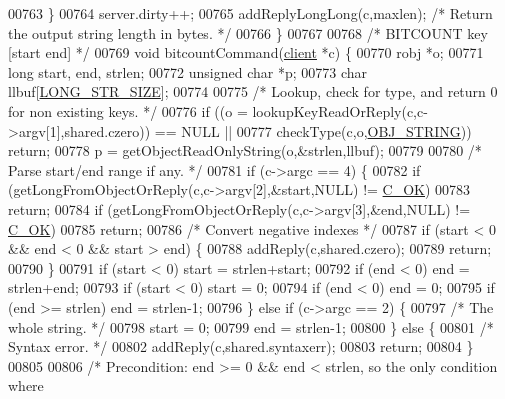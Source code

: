 \begin{DoxyCode}
{00763     \}
00764     server.dirty++;
00765     addReplyLongLong(c,maxlen); \textcolor{comment}{/* Return the output string length in bytes. */}
00766 \}
00767 
00768 \textcolor{comment}{/* BITCOUNT key [start end] */}
00769 \textcolor{keywordtype}{void} bitcountCommand(\hyperlink{structclient}{client} *c) \{
00770     robj *o;
00771     \textcolor{keywordtype}{long} start, end, strlen;
00772     \textcolor{keywordtype}{unsigned} \textcolor{keywordtype}{char} *p;
00773     \textcolor{keywordtype}{char} llbuf[\hyperlink{server_8h_a39ec35278876f65fc1ef70b049856ca3}{LONG\_STR\_SIZE}];
00774 
00775     \textcolor{comment}{/* Lookup, check for type, and return 0 for non existing keys. */}
00776     \textcolor{keywordflow}{if} ((o = lookupKeyReadOrReply(c,c->argv[1],shared.czero)) == NULL ||
00777         checkType(c,o,\hyperlink{server_8h_a65236ea160f69cdef33ec942092af88f}{OBJ\_STRING})) \textcolor{keywordflow}{return};
00778     p = getObjectReadOnlyString(o,&strlen,llbuf);
00779 
00780     \textcolor{comment}{/* Parse start/end range if any. */}
00781     \textcolor{keywordflow}{if} (c->argc == 4) \{
00782         \textcolor{keywordflow}{if} (getLongFromObjectOrReply(c,c->argv[2],&start,NULL) != \hyperlink{server_8h_a303769ef1065076e68731584e758d3e1}{C\_OK})
00783             \textcolor{keywordflow}{return};
00784         \textcolor{keywordflow}{if} (getLongFromObjectOrReply(c,c->argv[3],&end,NULL) != \hyperlink{server_8h_a303769ef1065076e68731584e758d3e1}{C\_OK})
00785             \textcolor{keywordflow}{return};
00786         \textcolor{comment}{/* Convert negative indexes */}
00787         \textcolor{keywordflow}{if} (start < 0 && end < 0 && start > end) \{
00788             addReply(c,shared.czero);
00789             \textcolor{keywordflow}{return};
00790         \}
00791         \textcolor{keywordflow}{if} (start < 0) start = strlen+start;
00792         \textcolor{keywordflow}{if} (end < 0) end = strlen+end;
00793         \textcolor{keywordflow}{if} (start < 0) start = 0;
00794         \textcolor{keywordflow}{if} (end < 0) end = 0;
00795         \textcolor{keywordflow}{if} (end >= strlen) end = strlen-1;
00796     \} \textcolor{keywordflow}{else} \textcolor{keywordflow}{if} (c->argc == 2) \{
00797         \textcolor{comment}{/* The whole string. */}
00798         start = 0;
00799         end = strlen-1;
00800     \} \textcolor{keywordflow}{else} \{
00801         \textcolor{comment}{/* Syntax error. */}
00802         addReply(c,shared.syntaxerr);
00803         \textcolor{keywordflow}{return};
00804     \}
00805 
00806     \textcolor{comment}{/* Precondition: end >= 0 && end < strlen, so the only condition where}
}
\end{DoxyCode}
